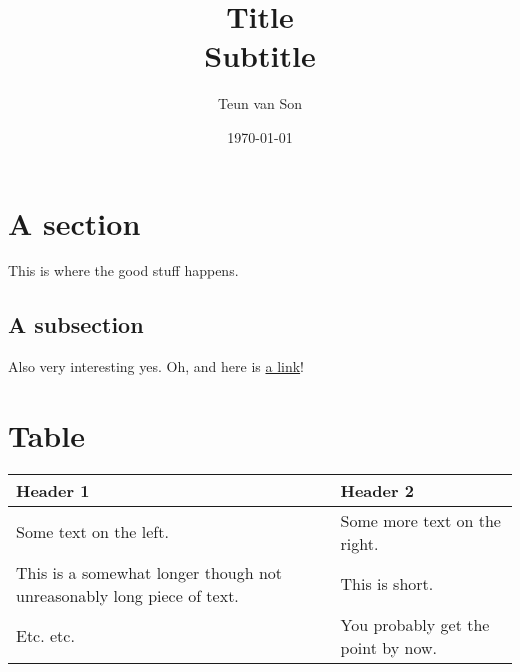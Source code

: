 \documentclass[UKenglish, titlepage]{article}
\author{Teun van Son}
\title{\textbf{Title}\\Subtitle}
\date{\today}
\begin{document}
\maketitle



\section{A section}
This is where the good stuff happens.

\subsection{A subsection}
Also very interesting yes.
Oh, and here is \href{https://youtu.be/dQw4w9WgXcQ}{a link}!


\section{Table}

\begingroup %
\setlength{\tabcolsep}{9pt} %
\renewcommand{\arraystretch}{1.5} %
\begin{tabular}{p{} p{}} \toprule
	\textbf{Header 1} & \textbf{Header 2} \\
	\midrule
	Some text on the left. & Some more text on the right. \\
	This is a somewhat longer though not unreasonably long piece of text. & This is short. \\
	Etc. etc. & You probably get the point by now. \\	
		\bottomrule
\end{tabular}
\endgroup

\end{document}
